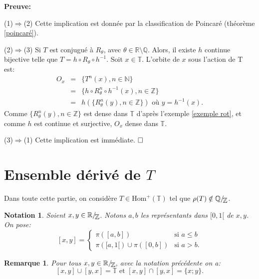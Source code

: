 \documentclass[11pt,a4 paper]{article}
\newtheorem{nota}[theoreme]{Notation}
\newtheorem{rmq}[theoreme]{Remarque}
\newcommand{\Tbb}{\mathbb{T}}
\newcommand{\Rbb}{\mathbb{R}}
\newcommand{\Qbb}{\mathbb{Q}}
\newcommand{\Zbb}{\mathbb{Z}}
\newcommand{\HomT}{\mathrm{Hom}^+(\Tbb)}
\newcommand*{\EnsembleQuotient}[2]%
{\ensuremath{%
		#1/\!\raisebox{-.65ex}{\ensuremath{\mathcal{#2}}}}}
\begin{document}
	\textbf{Preuve:}
	\par (1)$\Rightarrow$(2) Cette implication est donnée par la classification de Poincaré (théorème \ref{poincaré}).\\
	
	\par (2)$\Rightarrow$(3) Si $T$ est conjugué à $R_{\theta}$, avec $\theta \in \mathbb{R}\setminus \mathbb{Q}$. Alors, il existe $h$ continue bijective telle que $T=h\circ R_\theta \circ h^{-1}$. Soit $x\in \Tbb$. L'orbite de $x$ sous l'action de T est:
	\begin{eqnarray*}
		O_x&=&\lbrace T^n(x), n \in \mathbb{N} \rbrace \\
		&=& \lbrace h\circ R_\theta^n \circ h^{-1}(x), n \in \mathbb{Z} \rbrace\\
		&=& h(\lbrace R^n_\theta(y), n \in \mathbb{Z}\rbrace)\text{ où } y = h^{-1}(x).
	\end{eqnarray*} 
	Comme $\lbrace R^n_\theta(y), n \in \mathbb{Z}\rbrace$ est dense dans $\Tbb$ d'après l'exemple \ref{exemple rot}, et comme $h$ est continue et surjective, $O_x$ dense dans $\Tbb$.\\
	
	
	\par (3)$\Rightarrow$(1) Cette implication est immédiate. $\hfill \square$









\newpage
\section{Ensemble dérivé de $T$}
Dans toute cette partie, on considère $T \in \HomT$ tel que $\rho(T) \notin \EnsembleQuotient{\Qbb}{\Zbb}$.

\begin{nota}
	Soient $x,y \in \EnsembleQuotient{\Rbb}{\mathbb{Z}}$. Notons $a,b$ les représentants dans $[0,1[$ de $x,y$. On pose:
	$$[x,y] = \left\{
	\begin{array}{ll}
		\pi([a,b]) & \text{si } a\leq b \\
		\pi([a,1[)\cup \pi([0,b]) & \mbox{si } a>b.
	\end{array}
	\right.
	$$
\end{nota}

\begin{rmq}
	Pour tous $x, y \in \EnsembleQuotient{\Rbb}{\mathbb{Z}}$, avec la notation précédente on a:
	$$[x,y]\cup[y,x]=\Tbb \text{ et } [x,y]\cap[y,x]=\lbrace x; y\rbrace.$$
\end{rmq}
\end{document}
